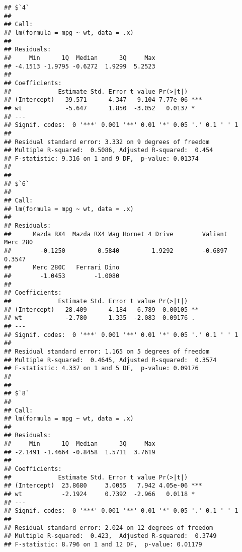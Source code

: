 \documentclass[
]{book}
\newenvironment{Shaded}{\begin{snugshade}}{\end{snugshade}}
\newcommand{\AttributeTok}[1]{\textcolor[rgb]{0.77,0.63,0.00}{#1}}
\newcommand{\CommentTok}[1]{\textcolor[rgb]{0.56,0.35,0.01}{\textit{#1}}}
\newcommand{\FunctionTok}[1]{\textcolor[rgb]{0.00,0.00,0.00}{#1}}
\newcommand{\NormalTok}[1]{#1}
\newcommand{\SpecialCharTok}[1]{\textcolor[rgb]{0.00,0.00,0.00}{#1}}
\newcommand{\StringTok}[1]{\textcolor[rgb]{0.31,0.60,0.02}{#1}}
\begin{document}
\begin{verbatim}
## $`4`
## 
## Call:
## lm(formula = mpg ~ wt, data = .x)
## 
## Residuals:
##     Min      1Q  Median      3Q     Max 
## -4.1513 -1.9795 -0.6272  1.9299  5.2523 
## 
## Coefficients:
##             Estimate Std. Error t value Pr(>|t|)    
## (Intercept)   39.571      4.347   9.104 7.77e-06 ***
## wt            -5.647      1.850  -3.052   0.0137 *  
## ---
## Signif. codes:  0 '***' 0.001 '**' 0.01 '*' 0.05 '.' 0.1 ' ' 1
## 
## Residual standard error: 3.332 on 9 degrees of freedom
## Multiple R-squared:  0.5086, Adjusted R-squared:  0.454 
## F-statistic: 9.316 on 1 and 9 DF,  p-value: 0.01374
## 
## 
## $`6`
## 
## Call:
## lm(formula = mpg ~ wt, data = .x)
## 
## Residuals:
##      Mazda RX4  Mazda RX4 Wag Hornet 4 Drive        Valiant       Merc 280 
##        -0.1250         0.5840         1.9292        -0.6897         0.3547 
##      Merc 280C   Ferrari Dino 
##        -1.0453        -1.0080 
## 
## Coefficients:
##             Estimate Std. Error t value Pr(>|t|)   
## (Intercept)   28.409      4.184   6.789  0.00105 **
## wt            -2.780      1.335  -2.083  0.09176 . 
## ---
## Signif. codes:  0 '***' 0.001 '**' 0.01 '*' 0.05 '.' 0.1 ' ' 1
## 
## Residual standard error: 1.165 on 5 degrees of freedom
## Multiple R-squared:  0.4645, Adjusted R-squared:  0.3574 
## F-statistic: 4.337 on 1 and 5 DF,  p-value: 0.09176
## 
## 
## $`8`
## 
## Call:
## lm(formula = mpg ~ wt, data = .x)
## 
## Residuals:
##     Min      1Q  Median      3Q     Max 
## -2.1491 -1.4664 -0.8458  1.5711  3.7619 
## 
## Coefficients:
##             Estimate Std. Error t value Pr(>|t|)    
## (Intercept)  23.8680     3.0055   7.942 4.05e-06 ***
## wt           -2.1924     0.7392  -2.966   0.0118 *  
## ---
## Signif. codes:  0 '***' 0.001 '**' 0.01 '*' 0.05 '.' 0.1 ' ' 1
## 
## Residual standard error: 2.024 on 12 degrees of freedom
## Multiple R-squared:  0.423,  Adjusted R-squared:  0.3749 
## F-statistic: 8.796 on 1 and 12 DF,  p-value: 0.01179
\end{verbatim}

\begin{Shaded}
\end{Shaded}
\end{document}
